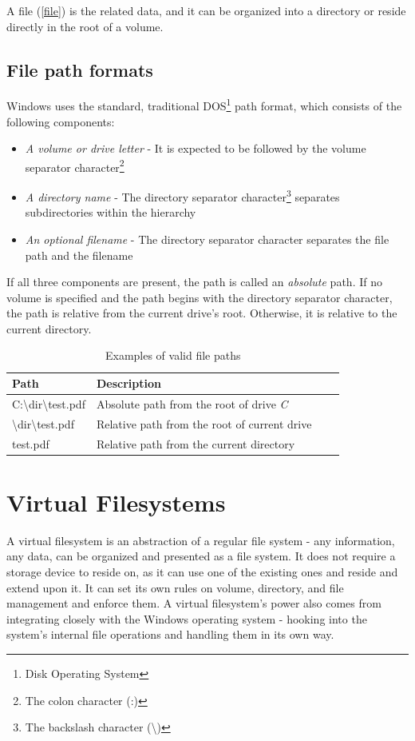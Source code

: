 A file (\ref{file}) is the related data, and it can be organized into a directory or reside directly in the root of a volume.

\subsection*{File path formats}
Windows uses the standard, traditional DOS\footnote{Disk Operating System} path format, which consists of the following components:

\begin{itemize}
    \item \textit{A volume or drive letter} - It is expected to be followed by the volume separator character\footnote{The colon character (:)}
    \item \textit{A directory name} - The directory separator character\footnote{The backslash character (\textbackslash{})} separates subdirectories within the hierarchy
    \item \textit{An optional filename} - The directory separator character separates the file path and the filename
\end{itemize}

If all three components are present, the path is called an \textit{absolute} path. If no volume is specified and the path begins with the directory separator character, the path is relative from the current drive's root. Otherwise, it is relative to the current directory.\cite{WinPathFormats}

\begin{table}[!hbt]
\centering
\caption{Examples of valid file paths}
\label{filepathsex}
\begin{tabular}{|l|l|l|l|}
\hline
\textbf{Path} & \textbf{Description} \\ \hline
C:\textbackslash{}dir\textbackslash{}test.pdf       & Absolute path from the root of drive \textit{C}    \\ \hline
\textbackslash{}dir\textbackslash{}test.pdf      & Relative path from the root of current drive     \\ \hline
test.pdf       & Relative path from the current directory     \\ \hline
\end{tabular}
\end{table}

\section{Virtual Filesystems}
\label{vfs}
A virtual filesystem is an abstraction of a regular file system - any information, any data, can be organized and presented as a file system. It does not require a storage device to reside on, as it can use one of the existing ones and reside and extend upon it. It can set its own rules on volume, directory, and file management and enforce them. A virtual filesystem's power also comes from integrating closely with the Windows operating system - hooking into the system's internal file operations and handling them in its own way.

